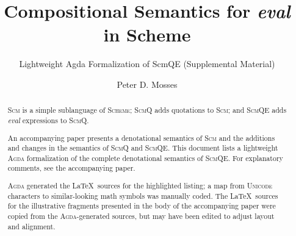 \documentclass[sigplan,screen]{acmart}
\begin{document}
\title{Compositional Semantics for \emph{eval} in Scheme}

\subtitle{Lightweight Agda Formalization of ScmQE (Supplemental Material)}


\author{Peter D. Mosses}

\renewcommand{\shortauthors}{Mosses}

\begin{abstract}

\textsc{Scm} is a simple sublanguage of \textsc{Scheme};
\textsc{ScmQ} adds quotations to \textsc{Scm}; and
\textsc{ScmQE} adds \emph{eval} expressions to \textsc{ScmQ}.

An accompanying paper presents a denotational semantics of \textsc{Scm}
and the additions and changes in the semantics of \textsc{ScmQ} and \textsc{ScmQE}.
This document lists a lightweight \textsc{Agda} formalization of the complete denotational semantics of \textsc{ScmQE}.
For explanatory comments, see the accompanying paper.

\textsc{Agda} generated the \LaTeX\ sources for the highlighted listing;
a map from \textsc{Unicode} characters to similar-looking math symbols was manually coded.
The \LaTeX\ sources for the illustrative fragments presented in the body of the accompanying paper were
copied from the \textsc{Agda}-generated sources, but may have been edited to adjust layout and alignment.

\end{abstract}
\end{document}
